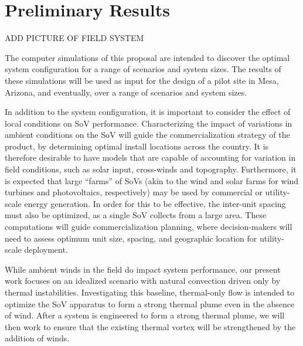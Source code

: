  
\section{Preliminary Results}
\label{sec:results}

ADD PICTURE OF FIELD SYSTEM 

The computer simulations of this proposal are intended to discover the
optimal system configuration for a range of scenarios and system sizes. The
results of these simulations will be used as input for the design of a
pilot site in Mesa, Arizona, and eventually, over a range of
scenarios and system sizes. 


In addition to the system configuration, it is important to consider the
effect of local conditions on SoV performance. Characterizing the impact
of variations in ambient conditions on the SoV will guide the
commercialization strategy of the product, by determining optimal
install locations across the country. It is therefore desirable to have models
that are capable of accounting for variation in field conditions, such
as solar input, cross-winds and topography. Furthermore, it is expected
that large ``farms'' of SoVs (akin to the wind and solar farms for wind
turbines and photovoltaics, respectively) may be used by commercial or
utility-scale energy generation. In order for this to be effective, 
the inter-unit spacing must also be optimized, as a single SoV collects
from a large area. These computations will guide commercialization
planning, where decision-makers will need to assess optimum unit size,
spacing, and geographic location for utility-scale deployment.  



While ambient winds in the field do impact system performance, our
present work focuses on an idealized scenario with natural convection
driven only by thermal instabilities. Investigating this baseline,
thermal-only flow is intended to optimize the SoV apparatus to form a
strong  thermal plume even in the absence of wind. After a system is
engineered to form a strong thermal plume, we will then work to ensure
that the existing thermal vortex will be strengthened by the addition of
winds.     

